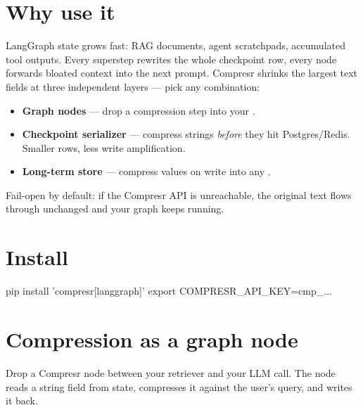 \documentclass[10pt]{article}
\begin{document}

\section{Why use it}

LangGraph state grows fast: RAG documents, agent scratchpads, accumulated
tool outputs. Every superstep rewrites the whole checkpoint row, every node
forwards bloated context into the next prompt. Compresr shrinks the largest
text fields at three independent layers --- pick any combination:

\begin{itemize}
    \item \textbf{Graph nodes} --- drop a compression step into your
          .
    \item \textbf{Checkpoint serializer} --- compress strings \emph{before}
          they hit Postgres/Redis. Smaller rows, less write amplification.
    \item \textbf{Long-term store} --- compress values on write into any
          .
\end{itemize}

Fail-open by default: if the Compresr API is unreachable, the original text
flows through unchanged and your graph keeps running.

\section{Install}

\begin{shcode}
pip install 'compresr[langgraph]'
export COMPRESR_API_KEY=cmp_...
\end{shcode}

\section{Compression as a graph node}

Drop a Compresr node between your retriever and your LLM call. The node
reads a string field from state, compresses it against the user's query,
and writes it back.
\end{document}
